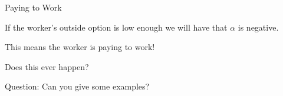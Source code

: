 \documentclass[aspectratio=169,usenames,dvipsnames]{beamer}
\newenvironment{wideitemize}{\itemize\addtolength{\itemsep}{10pt}}{\enditemize}
\begin{document}
\begin{frame}{Paying to Work}
    \begin{wideitemize}
        \item If the worker's outside option is low enough we will have that $\alpha$ is negative.
        \pause
        \item This means the worker is paying to work!
         \pause
        \item Does this ever happen?
         \pause
        \item Question: Can you give some examples?
    \end{wideitemize}
\end{frame}
\end{document}
